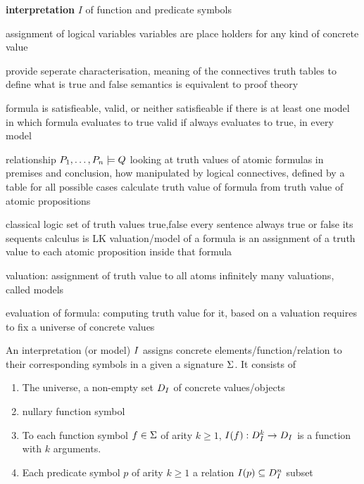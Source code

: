             \textbf{interpretation} $I$ of function and predicate symbols

            assignment of logical variables
            variables are place holders for any kind of concrete value

            provide seperate characterisation, meaning of the connectives
            truth tables
            to define what is true and false
            semantics is equivalent to proof theory

            formula is satisfieable, valid, or neither
            satisfieable if there is at least one model in which formula evaluates to true
            valid if always evaluates to true, in every model

            relationship
            $P_1,\ldots,P_n\models Q$
            looking at truth values of atomic formulas in premises and conclusion, how manipulated by logical connectives, defined by a table for all possible cases
            calculate truth value of formula from truth value of atomic propositions

            classical logic \cite{reis2014cutelimination}
            set of truth values true,false
            every sentence always true or false
            its sequents calculus is LK
            valuation/model of a formula is an assignment of a truth value to each atomic proposition inside that formula

            valuation: assignment of truth value to all atoms
            infinitely many valuations, called models

            evaluation of formula: computing truth value for it, based on a valuation
            requires to fix a universe of concrete values

            \begin{definition}[Interpretation]
                An interpretation (or model) $I$ assigns concrete elements/function/relation to their corresponding symbols in a given a signature $\Sigma$. It consists of
                \begin{enumerate}
                    \item The universe, a non-empty set $D_{I}$ of concrete values/objects
                    \item nullary function symbol
                    \item To each function symbol $f\in\Sigma$ of arity $k\geq 1$, $I(f):D_{I}^k\rightarrow D_{I}$ is a function with $k$ arguments.
                    \item Each predicate symbol $p$ of arity $k\geq 1$ a relation $I(p)\subseteq D_{I}^n$ subset
                \end{enumerate}

            \end{definition}

